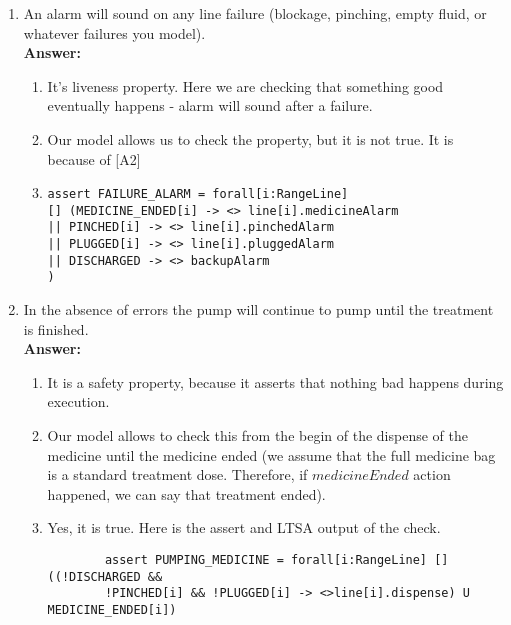 \documentclass{article}
\begin{document}
\begin{enumerate}
    \item An alarm will sound on any line failure (blockage, pinching, empty fluid, or whatever failures you model). \\
    \textbf{Answer:}
    \begin{enumerate}
    	\item It's liveness property. Here we are checking that something good eventually happens - alarm will sound after a failure.
		\item Our model allows us to check the property, but it is not true. It is because of [A2]
		\item 
		\begin{verbatim}
assert FAILURE_ALARM = forall[i:RangeLine] 
[] (MEDICINE_ENDED[i] -> <> line[i].medicineAlarm 
|| PINCHED[i] -> <> line[i].pinchedAlarm
|| PLUGGED[i] -> <> line[i].pluggedAlarm
|| DISCHARGED -> <> backupAlarm
)
		\end{verbatim}
	\end{enumerate}
	
    \item In the absence of errors the pump will continue to pump until the treatment is finished.\\
    \textbf{Answer:} 
    \begin{enumerate}
    	\item It is a safety property, because it asserts that nothing bad happens during execution.
    	\item Our model allows to check this from the begin of the dispense of the medicine until the medicine ended 
    	(we assume that the full medicine bag is a standard treatment dose. Therefore, if $medicineEnded$ action happened, we
    	can say that treatment ended).
    	\item Yes, it is true. Here is the assert and LTSA output of the check.
    	\begin{verbatim}
    	assert PUMPING_MEDICINE = forall[i:RangeLine] []((!DISCHARGED && 
    	!PINCHED[i] && !PLUGGED[i] -> <>line[i].dispense) U MEDICINE_ENDED[i])
    	

\end{verbatim}
\end{enumerate}
\end{enumerate}
\end{document}
